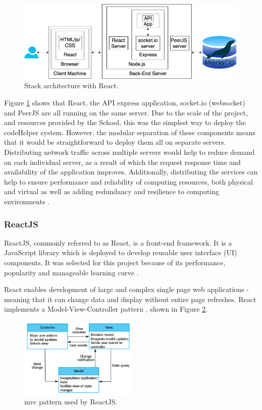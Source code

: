 \begin{figure}[H]
    \centering
    \includegraphics[width=\textwidth]{7design/images/architecture.png}
    \caption{Stack architecture with React.}
    \label{fig:architecture}
\end{figure}

Figure \ref{fig:architecture} shows that React, the API express application, socket.io (websocket) and PeerJS are all running on the same server. Due to the scale of the project, and resources provided by the School, this was the simplest way to deploy the codeHelper system. However, the modular separation of these components means that it would be straightforward to deploy them all on separate servers. Distributing network traffic across multiple servers would help to reduce demand on each individual server, as a result of which the request response time and availability of the application improves. Additionally, distributing the services can help to ensure performance and reliability of computing resources, both physical and virtual as well as adding redundancy and resilience to computing environments \cite{ibmload}.

\subsubsection{ReactJS}\label{sec:designreact}

ReactJS, commonly referred to as React, is a front-end framework. It is a JavaScript library which is deployed to develop reusable user interface (UI) components. It was selected for this project because of its performance, popularity and manageable learning curve \cite{Aggarwal}.

React enables development of large and complex single page web applications - meaning that it can change data and display without entire page refreshes. React implements a Model-View-Controller pattern \cite{Aggarwal}, shown in Figure \ref{fig:mvcreact}.

\begin{figure}[H]
    \centering
    \includegraphics[width=0.5\textwidth]{7design/images/mvc.png}
    \caption{\gls{mvc} pattern \cite{sommerville} used by ReactJS.}
    \label{fig:mvcreact}
\end{figure}


